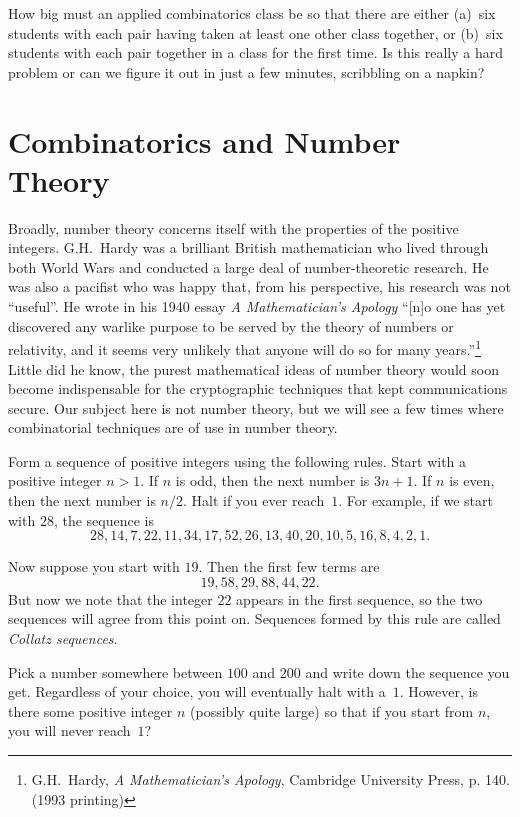 \begin{example}
How big must an applied combinatorics class be so that there are
either (a)~six students with each pair having taken at least one
other class together, or (b)~six students with each pair together
in a class for the first time.  Is this really a hard problem or
can we figure it out in just a few minutes, scribbling on a napkin?
\end{example}
 
\section{Combinatorics and Number Theory}\label{s:intro:number}

Broadly, number theory concerns itself with the properties of the
positive integers. G.H.\ Hardy was a brilliant British mathematician
who lived through both World Wars and conducted a large deal of
number-theoretic research. He was also a pacifist who was happy that,
from his perspective, his research was not ``useful''. He wrote in his
1940 essay \emph{A Mathematician's Apology} ``[n]o one has yet
discovered any warlike purpose to be served by the theory of numbers
or relativity, and it seems very unlikely that anyone will do so for
many years.''\footnote{G.H.\ Hardy, \textit{A Mathematician's
    Apology}, Cambridge University Press, p. 140. (1993 printing)}
Little did he know, the purest mathematical ideas of number theory
would soon become indispensable for the cryptographic techniques that
kept communications secure. Our subject here is not number theory, but
we will see a few times where combinatorial techniques are of use in
number theory.

\begin{example}\label{ex:collatz}
Form a sequence of positive integers using the
following rules.  Start with a positive integer $n>1$. If $n$ is odd,
then the next number is $3n+1$.  If $n$ is even, then the
next number is $n/2$.  Halt if you ever reach~$1$.
For example, if we start with $28$, the sequence is
\[
28, 14, 7, 22, 11, 34, 17, 52, 26, 13, 40, 20, 10, 5, 16, 8, 4, 2, 1.
\]

Now suppose you start with $19$.  Then the first few terms are
\[
19, 58, 29, 88, 44, 22.
\]
But now we note that the integer $22$ appears in the first sequence,
so the two sequences will agree from this point on.  Sequences formed
by this rule are called \textit{Collatz sequences}.

Pick a number somewhere between $100$ and $200$ and write down the sequence
you get.  Regardless of your choice, you will eventually halt with a~$1$.
However, is there some positive integer $n$ (possibly quite large) so
that if you start from $n$, you will never reach~$1$?
\end{example}
 
